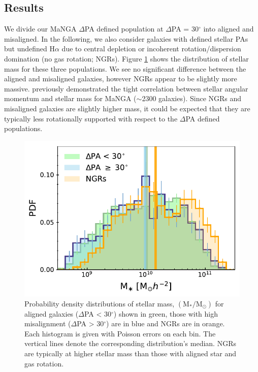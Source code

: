\subsection{Results} \label{sec:results_obs}
We divide our MaNGA $\Delta$PA defined population at $\Delta$PA = 30$^{\circ}$ into aligned and misaligned. In the following, we also consider galaxies with defined stellar PAs but undefined H$\alpha$ due to central depletion or incoherent rotation/dispersion domination (no gas rotation; NGRs). Figure \ref{fig:delPA_stelM} shows the distribution of stellar mass for these three populations. We see no significant difference between the aligned and misaligned galaxies, however NGRs appear to be slightly more massive. \citet{graham2018} previously demonstrated the tight correlation between stellar angular momentum and stellar mass for MaNGA ($\sim$2300 galaxies). Since NGRs and misaligned galaxies are slightly higher mass, it could be expected that they are typically less rotationally supported with respect to the $\Delta$PA defined populations. 

\begin{figure}
    \centering
	\includegraphics[width=0.7\linewidth]{thesis/latex/misalignment_MaNGA/delPA_stelM.pdf}
    \caption{Probability density distributions of stellar mass, $\mathrm{(M_{\ast}/M_{\odot})}$ for aligned galaxies ($\Delta$PA < 30$^{\circ}$) shown in green, those with high misalignment ($\Delta$PA > 30$^{\circ}$) are in blue and NGRs are in orange. Each histogram is given with Poisson errors on each bin. The vertical lines denote the corresponding distribution's median. NGRs are typically at higher stellar mass than those with aligned star and gas rotation.}
    \label{fig:delPA_stelM}
\end{figure}

